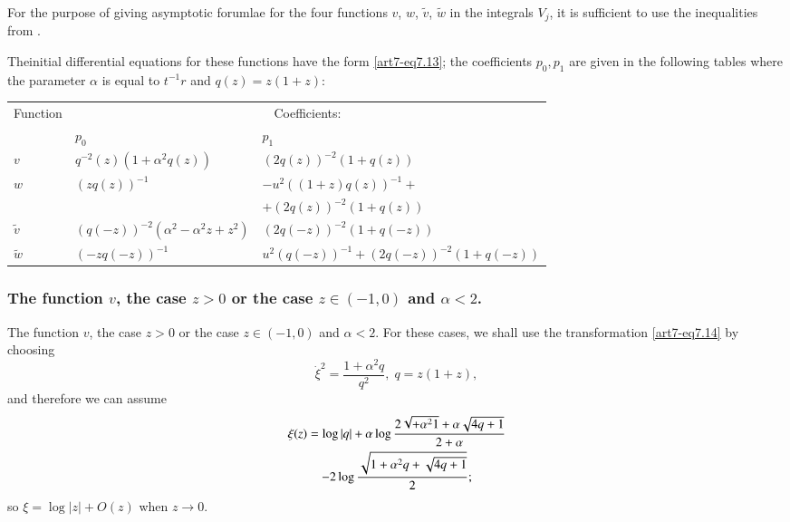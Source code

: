 For the purpose of giving asymptotic forumlae for the four functions $v$, $w$, $\tilde{v}$, $\tilde{w}$ in the integrals $V_j$, it is sufficient to use the inequalities from \cite{art7-key56}.

The\pageoriginale  initial differential equations for these functions have the form \eqref{art7-eq7.13}; the coefficients $p_0, p_1$ are given in the following tables where the parameter $\alpha$ is equal to $t^{-1} r$ and $q (z) = z (1+z)$:
\begin{center}
{\fontsize{10}{12}\selectfont
\renewcommand{\arraystretch}{1.2}
\tabcolsep=5pt
\begin{tabular}{|l|l|l|}
\hline
Function & \multicolumn{2}{c|}{Coefficients:}\\\cline{2-3}
& $p_0$ & $p_1$ \\\hline
$v$ & $q^{-2}(z) (1+\alpha^2 q (z))$ & $(2q (z))^{-2} (1+ q(z))$\\\hline
$w$ & $(z q(z))^{-1}$ & $-u^2 ((1+ z) q (z))^{-1} +$\\
& & $+ (2 q (z))^{-2} (1+ q(z))$\\\hline
$\tilde{v}$ & $(q(-z))^{-2} (\alpha^2 - \alpha^2 z + z^2)$ & $(2q (-z))^{-2} (1+ q (-z))$ \\\hline
$\tilde{w}$ & $(-zq (-z))^{-1}$ & $u^2 (q (-z))^{-1} + (2q (-z))^{-2} (1+ q (-z))$\\\hline
\end{tabular}}\relax
\end{center}

\setcounter{section}{2}
\subsubsection{The function $v$, the case $z>0$ or the case $z \in (-1,0)$ and $\alpha <2 $.}\label{art7-subsubsec2.6.3}
The function $v$, the case $z > 0$ or the case $z \in (-1,0)$ and $\alpha < 2$. For these cases, we shall use the transformation \eqref{art7-eq7.14} by choosing 
\setcounter{section}{7}
\setcounter{equation}{15}
\begin{equation}
\dot{\xi}^2 = \frac{1+ \alpha^2 q}{q^2} , \; q = z(1+z), \label{art7-eq7.16}
\end{equation}
and therefore we can assume
\begin{gather}
\xi(z) = \log  |q| + \alpha \log \frac{2\sqrt{+ \alpha^2 1} + \alpha \sqrt{4 q +1}}{2+\alpha} \label{art7-eq7.17}\\
- 2 \log \frac{\sqrt{1+ \alpha^2 q + \sqrt{4q+1}}}{2}; \notag
\end{gather}
so $\xi = \log |z| + O(z)$ when $z \to 0$.

